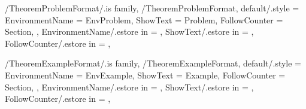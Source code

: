\newcommand{\InsertCondition}[2][\empty]
{%
  \InsertTheoremContent[#1]{\GetTheoremConditionFormatEnvironmentName}{#2}%
} %

\newcommand{\InitTheoremConditionFormat}
{%
  \theoremstyle{definition}%
  \ifthenelse{\equal{\GetTheoremConditionFormatFollowCounter}{\empty}}%
  {%
    \newtheorem{%
      \GetTheoremConditionFormatEnvironmentName}{%
      \GetTheoremConditionFormatShowText}%
  }%
  {%
    \MappingTheoremCounter[Condition]{\GetTheoremConditionFormatFollowCounter}%
    \newtheorem{%
      \GetTheoremConditionFormatEnvironmentName}{%
      \GetTheoremConditionFormatShowText}[%
      \GetTheoremConditionFormatFollowCounter]%
  }%
} %


\pgfkeys
{
  /TheoremProblemFormat/.is family, /TheoremProblemFormat,
  default/.style =
  {
    EnvironmentName = {EnvProblem},
    ShowText = {Problem},
    FollowCounter = Section,
  },
  EnvironmentName/.estore in = \GetTheoremProblemFormatEnvironmentName,
  ShowText/.estore in = \GetTheoremProblemFormatShowText,
  FollowCounter/.estore in = \GetTheoremProblemFormatFollowCounter,
} %

\newcommand{\InsertProblem}[2][\empty]
{%
  \InsertTheoremContent[#1]{\GetTheoremProblemFormatEnvironmentName}{#2}%
} %

\newcommand{\InitTheoremProblemFormat}
{%
  \theoremstyle{definition}%
  \ifthenelse{\equal{\GetTheoremProblemFormatFollowCounter}{\empty}}%
  {%
    \newtheorem{%
      \GetTheoremProblemFormatEnvironmentName}{%
      \GetTheoremProblemFormatShowText}%
  }%
  {%
    \MappingTheoremCounter[Problem]{\GetTheoremProblemFormatFollowCounter}%
    \newtheorem{%
      \GetTheoremProblemFormatEnvironmentName}{%
      \GetTheoremProblemFormatShowText}[%
      \GetTheoremProblemFormatFollowCounter]%
  }%
} %


\pgfkeys
{
  /TheoremExampleFormat/.is family, /TheoremExampleFormat,
  default/.style =
  {
    EnvironmentName = {EnvExample},
    ShowText = {Example},
    FollowCounter = Section,
  },
  EnvironmentName/.estore in = \GetTheoremExampleFormatEnvironmentName,
  ShowText/.estore in = \GetTheoremExampleFormatShowText,
  FollowCounter/.estore in = \GetTheoremExampleFormatFollowCounter,
} %

